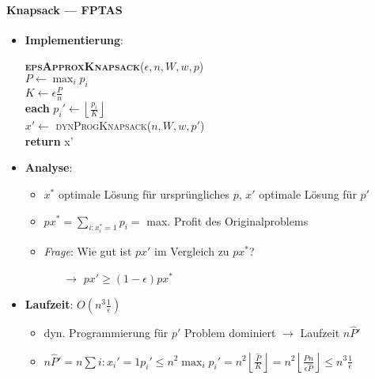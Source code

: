 \newpage

\paragraph{Knapsack --- FPTAS}
\begin{itemize}
  \item \textbf{Implementierung}:
  \begin{pseudocode}
    \textsc{\textbf{epsApproxKnapsack}}($ \epsilon, n, W, w, p $) \\
    $ P \leftarrow \max_ip_i $ \\
    $ K \leftarrow \epsilon\tfrac{P}{n} $ \\
    \textbf{each} $ p_i' \leftarrow \left\lfloor \tfrac{p_i}{K} \right\rfloor $ \\
    $ x' \leftarrow $ \textsc{dynProgKnapsack}($ n, W, w, p' $) \\
    \textbf{return} x'  
  \end{pseudocode}
  \item \textbf{Analyse}:
  \begin{itemize}
    \item $ x^* $ optimale Lösung für ursprüngliches $ p $, $ x' $ optimale Lösung für $ p' $
    \item $ px^* = \sum_{i : x_i^* = 1}p_i = $ max. Profit des Originalproblems
    \item \emph{Frage}: Wie gut ist $ px' $ im Vergleich zu $ px^* $?
    \begin{itemize}
      \item[$ \to $] $ px' \geq (1-\epsilon)px^* $ 
    \end{itemize}
  \end{itemize}
  \item \textbf{Laufzeit}: $ O(n^3\tfrac{1}{\epsilon}) $
  \begin{itemize}
    \item dyn. Programmierung für $ p' $ Problem dominiert $ \to $ Laufzeit $ n\hat{P}' $
    \item $ n\hat{P}' = n\sum{i : x_i' = 1}p_i' \leq n^2\max_ip_i' = n^2\left\lfloor \tfrac{\hat{P}}{K}\right\rfloor = n^2\left\lfloor \tfrac{\hat{P}n}{\epsilon \hat{P}} \right\rfloor \leq n^3\tfrac{1}{\epsilon} $
  \end{itemize}
\end{itemize}